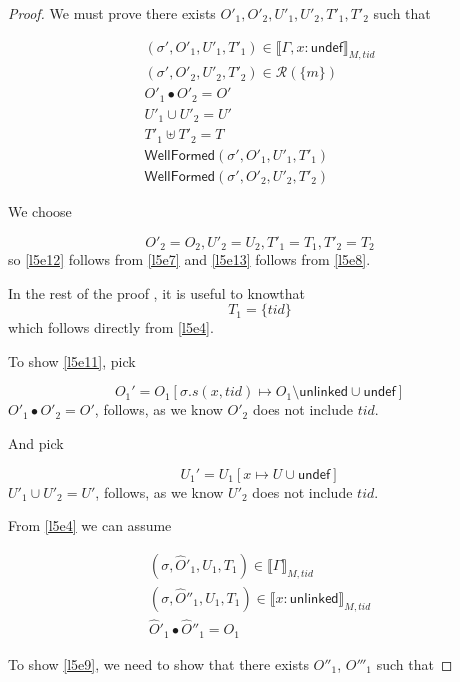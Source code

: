 \begin{proof}
We must prove there exists $O'_{1}, O'_{2}, U'_{1}, U'_{2}, T'_{1}, T'_{2}$ such that


\begin{gather}\label{l5e9}
(\sigma',O'_{1},U'_{1}, T'_{1}) \in \llbracket \Gamma,x:\mathsf{undef}  \rrbracket_{M,tid}
\\
\label{l5e10}
(\sigma',O'_{2},U'_{2}, T'_{2}) \in \mathcal{R}(\{m\})
\\
 \label{l5e11}
O'_{1} \bullet O'_{2} = O'
\\
 \label{l5e12}
U'_{1} \cup U'_{2} = U' 
\\
 \label{l5e13}
T'_{1} \uplus T'_{2} = T
\\
\label{l5wfp1}
\textsf{WellFormed}(\sigma',O'_{1},U'_{1},T'_{1})
\\
\label{l5wfp2}
\textsf{WellFormed}(\sigma',O'_{2},U'_{2},T'_{2})
\end{gather}

We choose 

\[O'_{2} = O_{2}, U'_{2} = U_{2}, T'_{1} = T_{1}, T'_{2} = T_{2}  \] so \ref{l5e12} follows from \ref{l5e7} and \ref{l5e13} follows from \ref{l5e8}.

In the rest of the proof , it is useful to knowthat
\begin{equation} \label{l5e14}
T_{1} = \{tid\}
\end{equation}
which follows directly from \ref{l5e4}.

To show \ref{l5e11}, pick

\[O_{1}' = O_{1}[\sigma.s(x,tid) \mapsto O_{1} \setminus \mathsf{unlinked} \cup \mathsf{undef} ]\]
$O'_{1} \bullet O'_{2} = O'$, follows, as we know $O'_{2}$ does not include $tid$.

And pick

\[U_{1}' = U_{1}[x \mapsto U \cup \mathsf{undef}]\]
$U'_{1} \cup U'_{2} = U'$, follows, as we know $U'_{2}$ does not include $tid$.

From \ref{l5e4} we can assume

\begin{gather} \label{l5e14}
(\sigma,\hat{O}'_{1},U_{1},T_{1})  \in \llbracket \Gamma \rrbracket_{M,tid}
\\
 \label{l5e15}
(\sigma,\hat{O}''_{1},U_{1},T_{1})  \in \llbracket x:\mathsf{unlinked} \rrbracket_{M,tid}
\\
 \label{l5e16}
\hat{O}'_{1} \bullet \hat{O}''_{1} = O_{1}
\end{gather}


To show \ref{l5e9}, we need to show that there exists  $O''_{1}$, $O'''_{1}$ such that 


\end{proof}
